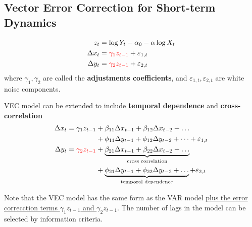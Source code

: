 \documentclass[11pt]{article}
\begin{document}
        \subsection{Vector Error Correction for Short-term Dynamics}
            \begin{definition}
                \begin{align}
                    z_t &= \log Y_t - \alpha_0 - \alpha \log X_t \\
                    \Delta x_t &= \textcolor{red}{\gamma_1 z_{t-1}} + \varepsilon_{1,t} \\
                    \Delta y_t &= \textcolor{red}{\gamma_2 z_{t-1}} + \varepsilon_{2,t}
                \end{align}
                where $\gamma_1, \gamma_2$ are called the \textbf{adjustments coefficients}, and $\varepsilon_{1, t}, \varepsilon_{2, t}$ are white noise components.
            \end{definition}

            \begin{definition}
                VEC model can be extended to include \textbf{temporal dependence} and \textbf{cross-correlation}
                \begin{align}
                    \Delta x_t = \gamma_1 z_{t-1} 
                    &+ \beta_{11} \Delta x_{t-1} + \beta_{12} \Delta x_{t-2} + \dots \\
                    &+ \phi_{11} \Delta y_{t-1} + \phi_{12} \Delta y_{t-2} + \dots + \varepsilon_{1, t} \\
                    \Delta y_t = \textcolor{red}{\gamma_2 z_{t-1}} 
                    &+ \underbrace{\beta_{21} \Delta x_{t-1} + \beta_{22} \Delta x_{t-2} + \dots}_{\text{{cross correlation}}} \\
                    &+ \underbrace{\phi_{21} \Delta y_{t-1} + \phi_{22} \Delta y_{t-2} + \dots}_{\text{{temporal dependence}}} + \varepsilon_{2, t}
                \end{align}
            \end{definition}
            
            \begin{remark}
                Note that the VEC model has the same form as the VAR model \ul{plus the error correcction terms $\gamma_1 z_{t-1}$ and $\gamma_2 z_{t-1}$}. The number of lags in the model can be selected by information criteria.
            \end{remark}
            
\end{document}
